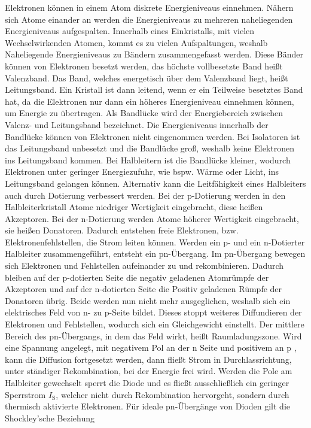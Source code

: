 \documentclass[
12pt,
a4paper,
bibliography=totocnumbered, %
BCOR=1cm, %
oneside, %
]{scrartcl}
\begin{document}
Elektronen können in einem Atom diskrete Energieniveaus einnehmen. Nähern sich Atome einander an werden die Energieniveaus zu mehreren naheliegenden Energieniveaus aufgespalten. Innerhalb eines Einkristalls, mit vielen Wechselwirkenden Atomen, kommt es zu vielen Aufspaltungen, weshalb Naheliegende Energieniveaus zu Bändern zusammengefasst werden. Diese Bänder können von Elektronen besetzt werden, das höchste vollbesetzte Band heißt Valenzband. Das Band, welches energetisch über dem Valenzband liegt, heißt Leitungsband. Ein Kristall ist dann leitend, wenn er ein Teilweise besetztes Band hat, da die Elektronen nur dann ein höheres Energieniveau einnehmen können, um Energie zu übertragen. Als Bandlücke wird der Energiebereich zwischen Valenz- und Leitungsband bezeichnet. Die Energieniveaus innerhalb der Bandlücke können von Elektronen nicht eingenommen werden. Bei Isolatoren ist das Leitungsband unbesetzt und die Bandlücke groß, weshalb keine Elektronen ins Leitungsband kommen. Bei Halbleitern ist die Bandlücke kleiner, wodurch Elektronen unter geringer Energiezufuhr, wie bspw. Wärme oder Licht, ins Leitungsband gelangen können. Alternativ kann die Leitfähigkeit eines Halbleiters auch durch Dotierung verbessert werden. Bei der p-Dotierung werden in den Halbleiterkristall Atome niedriger Wertigkeit eingebracht, diese heißen Akzeptoren. Bei der n-Dotierung werden Atome höherer Wertigkeit eingebracht, sie heißen Donatoren. Dadurch entstehen freie Elektronen, bzw. Elektronenfehlstellen, die Strom leiten können.
Werden ein p- und ein n-Dotierter Halbleiter zusammengeführt, entsteht ein pn-Übergang. Im pn-Übergang bewegen sich Elektronen und Fehlstellen aufeinander zu und rekombinieren. Dadurch bleiben auf der p-dotierten Seite die negativ geladenen Atomrümpfe der Akzeptoren und auf der n-dotierten Seite die Positiv geladenen Rümpfe der Donatoren übrig. Beide werden nun nicht mehr ausgeglichen, weshalb sich ein elektrisches Feld von n- zu p-Seite bildet. Dieses stoppt weiteres Diffundieren der Elektronen und Fehlstellen, wodurch sich ein Gleichgewicht einstellt. Der mittlere Bereich des pn-Übergangs, in dem das Feld wirkt, heißt Raumladungszone.
Wird eine Spannung angelegt, mit negativem Pol an der n Seite und positivem an p , kann die Diffusion fortgesetzt werden, dann fließt Strom in Durchlassrichtung, unter ständiger Rekombination, bei der Energie frei wird. Werden die Pole am Halbleiter gewechselt sperrt die Diode und es fließt ausschließlich ein geringer Sperrstrom \(I_{\text{S}}\), welcher nicht durch Rekombination hervorgeht, sondern durch thermisch aktivierte Elektronen. Für  ideale pn-Übergänge von Dioden gilt die  Shockley'sche Beziehung
\end{document}
